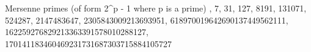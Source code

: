 Mersenne primes (of form 2^p - 1 where p is a prime)
, 7, 31, 127, 8191, 131071, 524287, 2147483647, 2305843009213693951, 618970019642690137449562111, 162259276829213363391578010288127, 170141183460469231731687303715884105727
